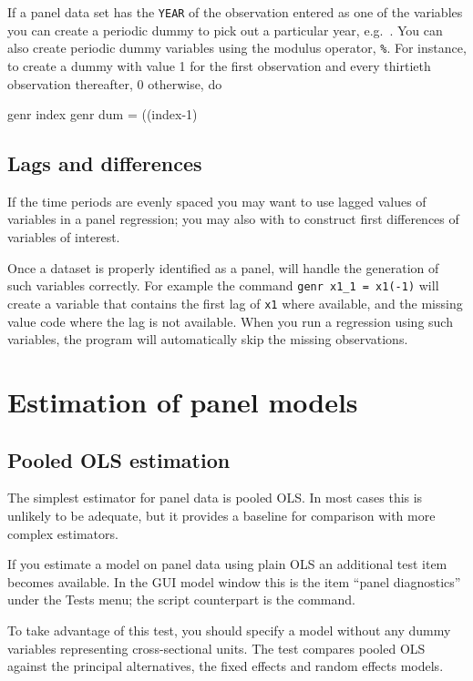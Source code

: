 If a panel data set has the \verb+YEAR+ of the observation entered as
one of the variables you can create a periodic dummy to pick out a
particular year, e.g.\ .  You can also
create periodic dummy variables using the modulus operator,
\verb+%+.  For instance, to create a dummy with
value 1 for the first observation and every thirtieth observation
thereafter, 0 otherwise, do
\begin{code}
      genr index 
      genr dum = ((index-1)%
\end{code}

\subsection{Lags and differences}
\label{panel-lagged}

If the time periods are evenly spaced you may want to use lagged
values of variables in a panel regression; you may also with to
construct first differences of variables of interest.

Once a dataset is properly identified as a panel,  will
handle the generation of such variables correctly.  For example the
command \verb+genr x1_1 = x1(-1)+ will create a variable that contains
the first lag of \verb+x1+ where available, and the missing value code
where the lag is not available.  When you run a regression using such
variables, the program will automatically skip the missing
observations.

\section{Estimation of panel models}

\subsection{Pooled OLS estimation}
\label{pooled-est}

The simplest estimator for panel data is pooled OLS.  In most cases
this is unlikely to be adequate, but it provides a baseline for
comparison with more complex estimators.

If you estimate a model on panel data using plain OLS an additional test
item becomes available.  In the GUI model window this is the item
``panel diagnostics'' under the \textsf{Tests} menu; the script
counterpart is the  command.

To take advantage of this test, you should specify a model without any
dummy variables representing cross-sectional units.  The test compares
pooled OLS against the principal alternatives, the fixed effects and
random effects models.

